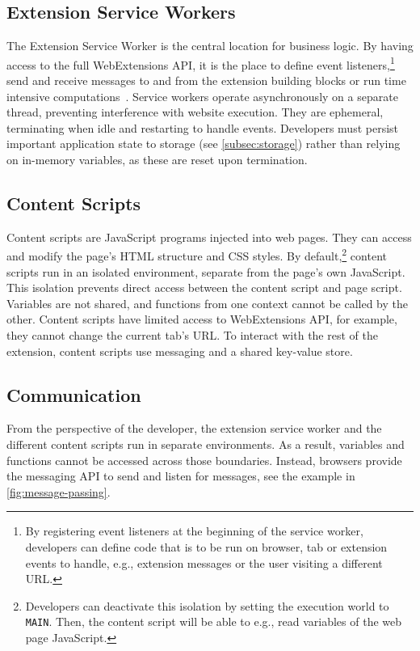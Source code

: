 \subsection{Extension Service Workers} \label{subsec:service-workers}
The Extension Service Worker is the central location for business logic.
By having access to the full WebExtensions API, it is the place to define event listeners,\footnote{
By registering event listeners at the beginning of the service worker, developers can define code that is to be run on browser, tab or extension events to handle, e.g., extension messages or the user visiting a different URL.}
send and receive messages to and from the extension building blocks 
or run time intensive computations~\cite[Ch. 4]{frisbie2023browser}.
Service workers operate asynchronously on a separate thread, preventing interference with website execution. 
They are ephemeral, terminating when idle and restarting to handle events. Developers must persist important application state to storage (see \cref{subsec:storage}) rather than relying on in-memory variables, as these are reset upon termination.

\subsection{Content Scripts} \label{subsec:content-scripts}
Content scripts are JavaScript programs injected into web pages. 
They can access and modify the page's HTML structure and CSS styles.
By default,\footnote{
Developers can deactivate this isolation by setting the execution world to \texttt{MAIN}. Then, the content script will be able to e.g., read variables of the web page JavaScript.
} content scripts run in an isolated environment, separate from the page's own JavaScript.
This isolation prevents direct access between the content script and page script.
Variables are not shared, and functions from one context cannot be called by the other.
Content scripts have limited access to WebExtensions API, for example, they cannot change the current tab's URL.
To interact with the rest of the extension, content scripts use messaging and a shared key-value store.

\subsection{Communication}
From the perspective of the developer, the extension service worker and the different content scripts run in separate environments. 
As a result, variables and functions cannot be accessed across those boundaries.
Instead, browsers provide the messaging API to send and listen for messages, see the example in \cref{fig:message-passing}.

